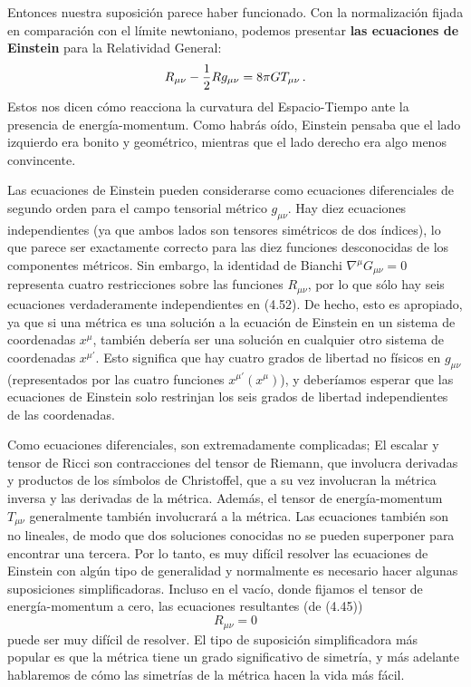 \documentclass[11pt,b5paper,openany,twoside]{book}
\newcommand{\mn}{{\mu\nu}}
\begin{document}
Entonces nuestra suposición parece haber funcionado.
Con la normalización fijada en comparación con el límite newtoniano, podemos presentar {\bf las ecuaciones de Einstein} para la Relatividad General:
\begin{equation}
R_{\mn} -{1\over 2}R g_\mn = 8\pi G T_{\mn}\,.\label{4.52}
\end{equation}
Estos nos dicen cómo reacciona la curvatura del Espacio-Tiempo ante la presencia de energía-momentum.
Como habrás oído, Einstein pensaba que el lado izquierdo era bonito y geométrico, mientras que el lado derecho era algo menos convincente.

Las ecuaciones de Einstein pueden considerarse como ecuaciones diferenciales de segundo orden para el campo tensorial métrico $g_\mn$.
Hay diez ecuaciones independientes (ya que ambos lados son tensores simétricos de dos índices), lo que parece ser exactamente correcto para las diez funciones desconocidas de los componentes métricos.
Sin embargo, la identidad de Bianchi $\nabla^\mu G_\mn=0$ representa cuatro restricciones sobre las funciones $R_{\mn}$, por lo que sólo hay seis ecuaciones verdaderamente independientes en (4.52).
De hecho, esto es apropiado, ya que si una métrica es una solución a la ecuación de Einstein en un sistema de coordenadas $x^\mu$, también debería ser una solución en cualquier otro sistema de coordenadas $x^{\mu'}$.
Esto significa que hay cuatro grados de libertad no físicos en $g_\mn$ (representados por las cuatro funciones $x^{\mu'}(x^\mu)$), y deberíamos esperar que las ecuaciones de Einstein solo restrinjan los seis grados de libertad independientes de las coordenadas.

Como ecuaciones diferenciales, son extremadamente complicadas; El escalar y tensor de Ricci son contracciones del tensor de Riemann, que involucra derivadas y productos de los símbolos de Christoffel, que a su vez involucran la métrica inversa y las derivadas de la métrica.
Además, el tensor de energía-momentum $T_\mn$ generalmente también involucrará a la métrica.
Las ecuaciones también son no lineales, de modo que dos soluciones conocidas no se pueden superponer para encontrar una tercera.
Por lo tanto, es muy difícil resolver las ecuaciones de Einstein con algún tipo de generalidad y normalmente es necesario hacer algunas suposiciones simplificadoras.
Incluso en el vacío, donde fijamos el tensor de energía-momentum a cero, las ecuaciones resultantes (de (4.45))
\begin{equation}
R_\mn=0\label{4.53}
\end{equation}
puede ser muy difícil de resolver.
El tipo de suposición simplificadora más popular es que la métrica tiene un grado significativo de simetría, y más adelante hablaremos de cómo las simetrías de la métrica hacen la vida más fácil.
\end{document}

